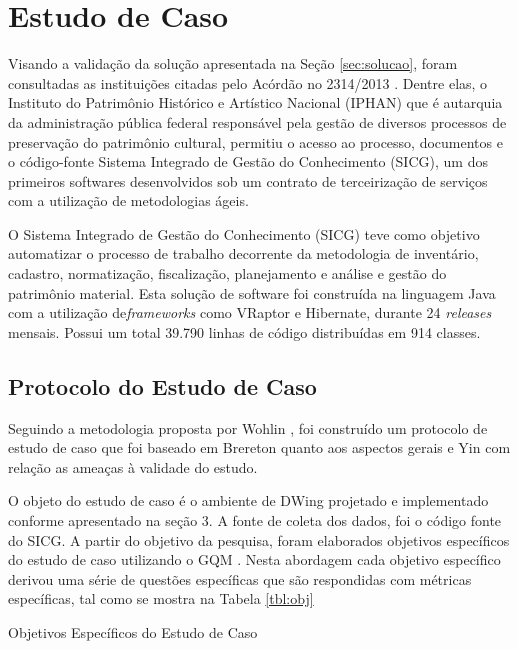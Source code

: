 \section {Estudo de Caso}

Visando a validação da solução apresentada na Seção \ref{sec:solucao}, foram consultadas as instituições citadas pelo Acórdão no 2314/2013 \cite{TCU:2013}. Dentre elas, o Instituto do Patrimônio Histórico e Artístico Nacional (IPHAN) que é autarquia da administração pública federal responsável pela gestão de diversos processos de preservação do patrimônio cultural, permitiu o acesso ao processo, documentos e o código-fonte Sistema Integrado de Gestão do Conhecimento (SICG), um dos primeiros softwares desenvolvidos sob um contrato de terceirização de serviços com a utilização de metodologias ágeis.

O Sistema Integrado de Gestão do Conhecimento (SICG) teve como objetivo automatizar o processo de trabalho decorrente da metodologia de inventário, cadastro, normatização, fiscalização, planejamento e análise e gestão do patrimônio material. Esta solução de software foi construída na linguagem Java com a utilização de\textit{frameworks} como VRaptor e Hibernate, durante 24 \textit{releases} mensais. Possui um total 39.790 linhas de código distribuídas em 914 classes.

\subsection{Protocolo do Estudo de Caso}
Seguindo a metodologia proposta por Wohlin \cite{wohlin2012experimentation}, foi construído um protocolo de estudo de caso que foi baseado em Brereton \cite{brereton2008using} quanto aos aspectos gerais e Yin \cite{yin2011applications} com relação as ameaças à validade do estudo. 

O objeto do estudo de caso é o ambiente de DWing projetado e implementado conforme apresentado na seção 3. A fonte de coleta dos dados, foi o código fonte do SICG. A partir do objetivo da pesquisa, foram elaborados objetivos específicos do estudo de caso utilizando o GQM \cite{Basili96b}. Nesta abordagem cada objetivo específico derivou uma série de questões específicas que são respondidas com métricas específicas, tal como se mostra na Tabela \ref{tbl:obj}

\begin{table}[ht]
\centering

\caption{Objetivos Específicos do Estudo de Caso}
\label{tbl:obj} 
\end{table}
\FloatBarrier


